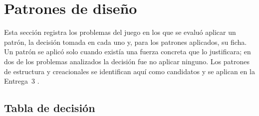 \section{Patrones de diseño}\label{sec:patrones}

Esta sección registra los problemas del juego en los que se evaluó aplicar un patrón, la decisión tomada en cada uno y, para los patrones aplicados, su ficha. Un patrón se aplicó solo cuando existía una fuerza concreta que lo justificara; en dos de los problemas analizados la decisión fue no aplicar ninguno. Los patrones de estructura y creacionales se identifican aquí como candidatos y se aplican en la Entrega~3 .

\subsection{Tabla de decisión}

